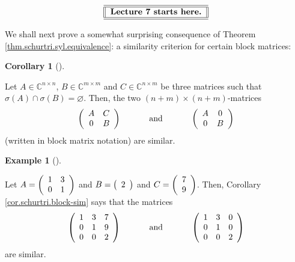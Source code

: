 \documentclass[numbers=enddot,12pt,final,onecolumn,notitlepage]{scrartcl}%
\numberwithin{exer}{subsection}
\theoremstyle{definition}
\newtheorem{coro}[theo]{Corollary}
\newenvironment{corollary}[1][]
{\begin{coro}[#1]\begin{leftbar}}
{\end{leftbar}\end{coro}}
\newtheorem{exam}[theo]{Example}
\newenvironment{example}[1][]
{\begin{exam}[#1]\begin{leftbar}}
{\end{leftbar}\end{exam}}
\begin{document}
\[%
\begin{tabular}
[c]{||l||}\hline\hline
\textbf{Lecture 7 starts here.}\\\hline\hline
\end{tabular}
\]


We shall next prove a somewhat surprising consequence of Theorem
\ref{thm.schurtri.syl.equivalence}: a similarity criterion for certain block matrices:

\begin{corollary}
\label{cor.schurtri.block-sim}Let $A\in\mathbb{C}^{n\times n}$, $B\in
\mathbb{C}^{m\times m}$ and $C\in\mathbb{C}^{n\times m}$ be three matrices
such that $\sigma\left(  A\right)  \cap\sigma\left(  B\right)  =\varnothing$.
Then, the two $\left(  n+m\right)  \times\left(  n+m\right)  $-matrices%
\[
\left(
\begin{array}
[c]{cc}%
A & C\\
0 & B
\end{array}
\right)  \ \ \ \ \ \ \ \ \ \ \text{and}\ \ \ \ \ \ \ \ \ \ \left(
\begin{array}
[c]{cc}%
A & 0\\
0 & B
\end{array}
\right)
\]
(written in block matrix notation) are similar.
\end{corollary}

\begin{example}
Let $A=\left(
\begin{array}
[c]{cc}%
1 & 3\\
0 & 1
\end{array}
\right)  $ and $B=\left(
\begin{array}
[c]{c}%
2
\end{array}
\right)  $ and $C=\left(
\begin{array}
[c]{c}%
7\\
9
\end{array}
\right)  $. Then, Corollary \ref{cor.schurtri.block-sim} says that the
matrices%
\[
\left(
\begin{array}
[c]{ccc}%
1 & 3 & 7\\
0 & 1 & 9\\
0 & 0 & 2
\end{array}
\right)  \ \ \ \ \ \ \ \ \ \ \text{and}\ \ \ \ \ \ \ \ \ \ \left(
\begin{array}
[c]{ccc}%
1 & 3 & 0\\
0 & 1 & 0\\
0 & 0 & 2
\end{array}
\right)
\]
are similar.
\end{example}
\end{document}
